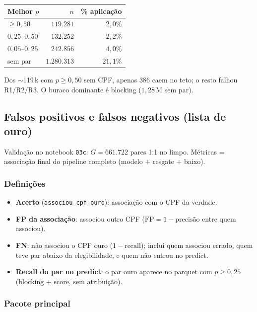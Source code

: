 \documentclass[11pt,a4paper]{article}
\begin{document}
\begin{center}
\begin{tabular}{@{}lrr@{}}
\toprule
Melhor $p$ & $n$ & \% aplicação \\
\midrule
$\ge 0{,}50$ & $119{.}281$ & $2{,}0\%$ \\
$0{,}25$--$0{,}50$ & $132{.}252$ & $2{,}2\%$ \\
$0{,}05$--$0{,}25$ & $242{.}856$ & $4{,}0\%$ \\
sem par & $1{.}280{.}313$ & $21{,}1\%$ \\
\bottomrule
\end{tabular}
\end{center}

Dos $\sim$119\,k com $p \ge 0{,}50$ sem CPF, apenas 386 caem no teto; o resto
falhou R1/R2/R3. O buraco dominante é blocking ($1{,}28$\,M sem par).

\subsection{Falsos positivos e falsos negativos (lista de ouro)}

Validação no notebook \texttt{03c}: $G = 661{.}722$ pares 1:1 no limpo.
Métricas = associação final do pipeline completo (modelo + resgate + baixo).

\subsubsection{Definições}

\begin{itemize}
  \item \textbf{Acerto} (\texttt{associou\_cpf\_ouro}): associação com o CPF da
        verdade.
  \item \textbf{FP da associação}: associou outro CPF
        ($\mathrm{FP} = 1 - \mathrm{precisão}$ entre quem associou).
  \item \textbf{FN}: não associou o CPF ouro ($1 - \mathrm{recall}$); inclui
        quem associou errado, quem teve par abaixo da elegibilidade, e quem
        não entrou no predict.
  \item \textbf{Recall do par no predict}: o par ouro aparece no parquet com
        $p \ge 0{,}25$ (blocking + score, sem atribuição).
\end{itemize}

\subsubsection{Pacote principal}
\end{document}
